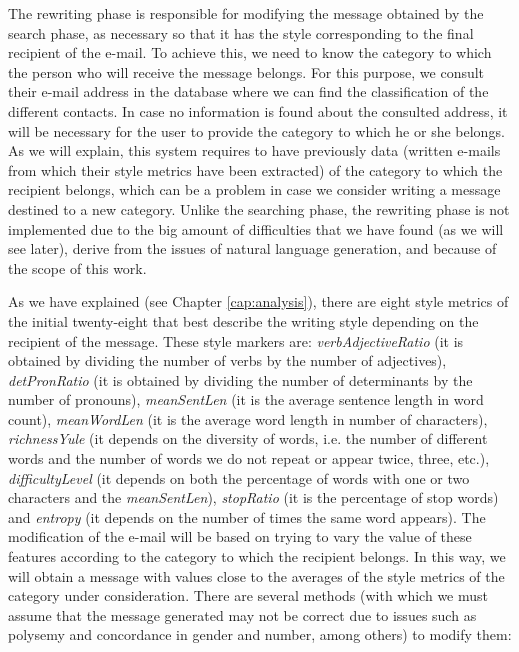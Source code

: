The rewriting phase is responsible for modifying the message obtained by the search phase, as necessary so that it has the style corresponding to the final recipient of the e-mail. To achieve this, we need to know the category to which the person who will receive the message belongs. For this purpose, we consult their e-mail address in the database where we can find the classification of the different contacts. In case no information is found about the consulted address, it will be necessary for the user to provide the category to which he or she belongs. As we will explain, this system requires to have previously data (written e-mails from which their style metrics have been extracted) of the category to which the recipient belongs, which can be a problem in case we consider writing a message destined to a new category. Unlike the searching phase, the rewriting phase is not implemented due to the big amount of difficulties that we have found (as we will see later), derive from the issues of natural language generation, and because of the scope of this work.

As we have explained (see Chapter \ref{cap:analysis}), there are eight style metrics of the initial twenty-eight that best describe the writing style depending on the recipient of the message. These style markers are: \textit{verbAdjectiveRatio} (it is obtained by dividing the number of verbs by the number of adjectives), \textit{detPronRatio} (it is obtained by dividing the number of determinants by the number of pronouns), \textit{meanSentLen} (it is the average sentence length in word count), \textit{meanWordLen} (it is the average word length in number of characters), \textit{richnessYule} (it depends on the diversity of words, i.e. the number of different words and the number of words we do not repeat or appear twice, three, etc.), \textit{difficultyLevel} (it depends on both the percentage of words with one or two characters and the \textit{meanSentLen}), \textit{stopRatio} (it is the percentage of stop words) and \textit{entropy} (it depends on the number of times the same word appears). The modification of the e-mail will be based on trying to vary the value of these features according to the category to which the recipient belongs. In this way, we will obtain a message with values close to the averages of the style metrics of the category under consideration. There are several methods (with which we must assume that the message generated may not be correct due to issues such as polysemy and concordance in gender and number, among others) to modify them:

